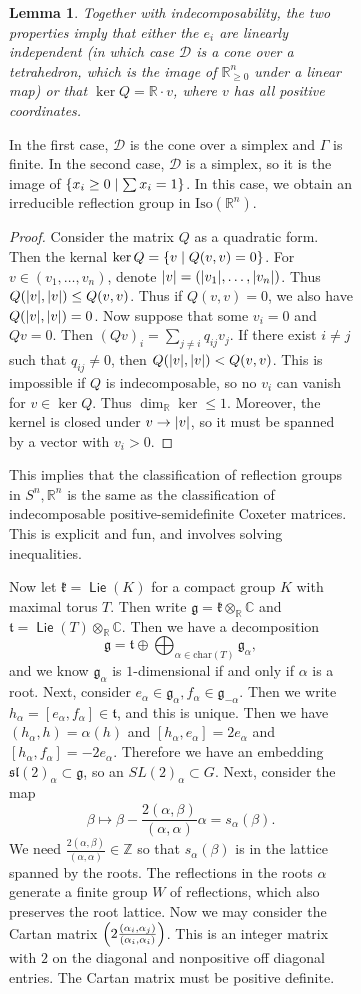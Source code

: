 \documentclass[leqno, openany]{memoir}
\newtheorem{lem}[thm]{Lemma}
\theoremstyle{definition}
\theoremstyle{remark}
\theoremstyle{plain}
\theoremstyle{definition}
\theoremstyle{remark}
\newcommand{\R}{\mathbb{R}}
\newcommand{\C}{\mathbb{C}}
\newcommand{\Z}{\mathbb{Z}}
\newcommand{\mc}[1]{\mathcal{#1}}
\newcommand{\mf}[1]{\mathfrak{#1}}
\newcommand{\mr}[1]{\mathrm{#1}}
\DeclareMathOperator{\Lie}{\mathsf{Lie}}
\begin{document}
\begin{figure}[H]
\begin{figure}[H]
\begin{lem} Together with indecomposability, the two properties imply that
    either the $e_i$ are linearly independent (in which case $\mc{D}$ is a cone
    over a tetrahedron, which is the image of $\R_{\geq 0}^n$ under a linear
    map) or that $\ker Q = \R \cdot v$, where $v$ has all positive coordinates.
\end{lem}

In the first case, $\mc{D}$ is the cone over a simplex and $\Gamma$ is finite.
In the second case, $\mc{D}$ is a simplex, so it is the image of $\qty{x_i \geq
0 \mid \sum x_i = 1}$. In this case, we obtain an irreducible reflection group
in $\mr{Iso}(\R^n)$.

\begin{proof} Consider the matrix $Q$ as a quadratic form. Then the kernal
    $\ker Q = \qty{v \mid Q(v,v) = 0}$. For $v \in (v_1, \ldots, v_n)$, denote
    $\abs{v} = (\abs{v_1}, \ldots, \abs{v_n})$. Thus $Q(\abs{v}, \abs{v}) \leq
    Q(v,v)$. Thus if $Q(v,v) = 0$, we also have $Q(\abs{v}, \abs{v}) = 0$. Now
    suppose that some $v_i = 0$ and $Qv = 0$. Then ${(Qv)}_i = \sum_{j \neq i}
    q_{ij} v_j$. If there exist $i \neq j$ such that $q_{ij} \neq 0$, then
    $Q(\abs{v}, \abs{v}) < Q(v,v)$. This is impossible if $Q$ is
    indecomposable, so no $v_i$ can vanish for $v \in \ker Q$. Thus $\dim_{\R}
    \ker \leq 1$. Moreover, the kernel is closed under $v \to \abs{v}$, so it
    must be spanned by a vector with $v_i > 0$.  \end{proof}

This implies that the classification of reflection groups in $S^n, \R^n$ is the
same as the classification of indecomposable positive-semidefinite Coxeter
matrices. This is explicit and fun, and involves solving inequalities. 

Now let $\mf{k} = \Lie(K)$ for a compact group $K$ with maximal torus $T$. Then
write $\mf{g} = \mf{k} \otimes_{\R} \C$ and $\mf{t} = \Lie(T) \otimes_{\R} \C$.
Then we have a decomposition \[ \mf{g} = \mf{t} \oplus \bigoplus_{\alpha \in
\mr{char}(T)} \mf{g}_{\alpha}, \] and we know $\mf{g}_{\alpha}$ is
$1$-dimensional if and only if $\alpha$ is a root. Next, consider $e_{\alpha}
\in \mf{g}_{\alpha}, f_{\alpha} \in \mf{g}_{-\alpha}$. Then we write
$h_{\alpha} = [e_{\alpha}, f_{\alpha}] \in \mf{t}$, and this is unique. Then we
have $(h_{\alpha}, h) = \alpha(h)$ and $[h_{\alpha}, e_{\alpha}] = 2
e_{\alpha}$ and $[h_{\alpha}, f_{\alpha}] = -2 e_{\alpha}$. Therefore we have
an embedding ${\mf{sl}(2)}_{\alpha} \subset \mf{g}$, so an ${SL(2)}_{\alpha}
\subset G$. Next, consider the map \[ \beta \mapsto \beta - \frac{2(\alpha,
\beta)}{(\alpha, \alpha)} \alpha = s_{\alpha}(\beta). \] We need
$\frac{2(\alpha,\beta)}{(\alpha, \alpha)} \in \Z$ so that $s_{\alpha}(\beta)$
is in the lattice spanned by the roots. The reflections in the roots $\alpha$
generate a finite group $W$ of reflections, which also preserves the root
lattice. Now we may consider the Cartan matrix $\qty(2
\frac{(\alpha_i,\alpha_j)}{(\alpha_i, \alpha_i)})$. This is an integer matrix
with $2$ on the diagonal and nonpositive off diagonal entries. The Cartan
matrix must be positive definite.


\end{figure}
\end{figure}
\end{document}
